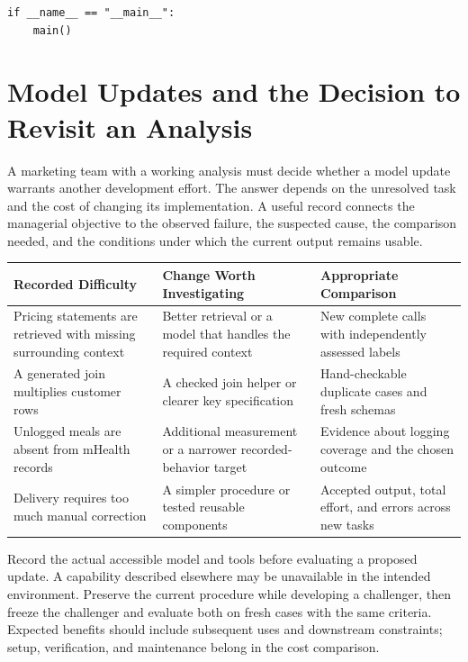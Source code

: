 \begin{Verbatim}[breaklines,breakanywhere,fontsize=\small]
if __name__ == "__main__":
    main()
\end{Verbatim}

\hypertarget{M08-model-updates-and-the-decision-to-revisit-an-analysis}{%
\section{Model Updates and the Decision to Revisit an
Analysis}\label{M08-model-updates-and-the-decision-to-revisit-an-analysis}}

\noindent \noindent A marketing team with a working analysis must decide whether a
model update warrants another development effort. The answer depends on
the unresolved task and the cost of changing its implementation. A
useful record connects the managerial objective to the observed failure,
the suspected cause, the comparison needed, and the conditions under
which the current output remains usable.

\begin{table}[H]
\centering\small
\begin{tabular}{@{}
  >{\raggedright\arraybackslash}p{}
  >{\raggedright\arraybackslash}p{}
  >{\raggedright\arraybackslash}p{}@{}}
\toprule
Recorded Difficulty & Change Worth Investigating & Appropriate
Comparison \\
\midrule

Pricing statements are retrieved with missing surrounding context &
Better retrieval or a model that handles the required context & New
complete calls with independently assessed labels \\
A generated join multiplies customer rows & A checked join helper or
clearer key specification & Hand-checkable duplicate cases and fresh
schemas \\
Unlogged meals are absent from mHealth records & Additional measurement
or a narrower recorded-behavior target & Evidence about logging coverage
and the chosen outcome \\
Delivery requires too much manual correction & A simpler procedure or
tested reusable components & Accepted output, total effort, and errors
across new tasks \\
\bottomrule
\end{tabular}
\end{table}

Record the actual accessible model and tools before evaluating a
proposed update. A capability described elsewhere may be unavailable in
the intended environment. Preserve the current procedure while
developing a challenger, then freeze the challenger and evaluate both on
fresh cases with the same criteria. Expected benefits should include
subsequent uses and downstream constraints; setup, verification, and
maintenance belong in the cost comparison.

